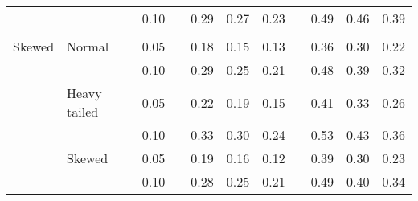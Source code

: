 \begin{table}[ht]
\begin{scriptsize}
\begin{center}
\begin{tabular}{ll p{.1cm} c p{.1cm} rrr p{.1cm} rrr}
             &              && 0.10 &&  0.29 & 0.27 & 0.23 && 0.49 & 0.46 & 0.39 \\ 
              &&&&&&&&&&&\\
Skewed       & Normal       && 0.05 &&  0.18 & 0.15 & 0.13 && 0.36 & 0.30 & 0.22 \\ 
             &              && 0.10 &&  0.29 & 0.25 & 0.21 && 0.48 & 0.39 & 0.32 \\ 
             & Heavy tailed && 0.05 &&  0.22 & 0.19 & 0.15 && 0.41 & 0.33 & 0.26 \\ 
             &              && 0.10 &&  0.33 & 0.30 & 0.24 && 0.53 & 0.43 & 0.36 \\ 
             & Skewed       && 0.05 &&  0.19 & 0.16 & 0.12 && 0.39 & 0.30 & 0.23 \\ 
             &              && 0.10 &&  0.28 & 0.25 & 0.21 && 0.49 & 0.40 & 0.34 \\

\hline
\end{tabular}
\end{center}
\end{scriptsize}
\end{table}


